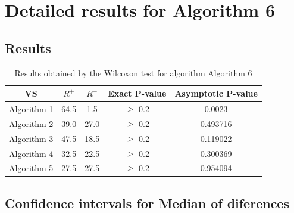 \documentclass[a4paper,10pt]{article}
\begin{document}
 \clearpage 


\section{Detailed results for Algorithm 6}


\subsection{Results}

\begin{table}[!htp]
\centering\small
\begin{tabular}{
|c|c|c|c|c|}
\hline
 VS & $R^{+}$ & $R^{-}$ & Exact P-value & Asymptotic P-value \\ \hline 
Algorithm 1 & 64.5 & 1.5 & $\geq$ 0.2 & 0.0023\\ \hline 
Algorithm 2 & 39.0 & 27.0 & $\geq$ 0.2 & 0.493716\\ \hline 
Algorithm 3 & 47.5 & 18.5 & $\geq$ 0.2 & 0.119022\\ \hline 
Algorithm 4 & 32.5 & 22.5 & $\geq$ 0.2 & 0.300369\\ \hline 
Algorithm 5 & 27.5 & 27.5 & $\geq$ 0.2 & 0.954094\\ \hline 

\end{tabular}
\caption{Results obtained by the Wilcoxon test for algorithm Algorithm 6}
\end{table}

\subsection{Confidence intervals for Median of diferences}
\end{document}
